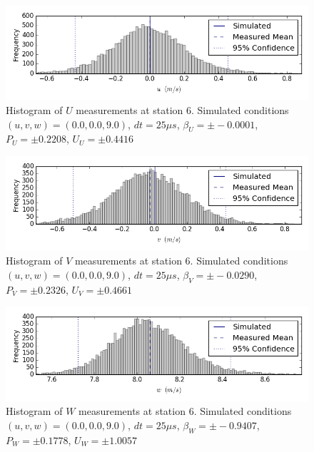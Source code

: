 \begin{figure}[H]
\centering
\includegraphics[width=6in]{figs/Ely_May28th06003/uncertainty_Ely_May28th06003_U}
\caption{Histogram of $U$ measurements at station 6. Simulated conditions $(u,v,w)=(0.0, 0.0, 9.0)$, $dt=25 \mu s$, $\beta_U=\pm -0.0001$, $P_U=\pm 0.2208$, $U_U=\pm 0.4416$}
\label{fig:uncertainty_Ely_May28th06003_U}
\end{figure}


\begin{figure}[H]
\centering
\includegraphics[width=6in]{figs/Ely_May28th06003/uncertainty_Ely_May28th06003_V}
\caption{Histogram of $V$ measurements at station 6. Simulated conditions $(u,v,w)=(0.0, 0.0, 9.0)$, $dt=25 \mu s$, $\beta_V=\pm -0.0290$, $P_V=\pm 0.2326$, $U_V=\pm 0.4661$}
\label{fig:uncertainty_Ely_May28th06003_V}
\end{figure}


\begin{figure}[H]
\centering
\includegraphics[width=6in]{figs/Ely_May28th06003/uncertainty_Ely_May28th06003_W}
\caption{Histogram of $W$ measurements at station 6. Simulated conditions $(u,v,w)=(0.0, 0.0, 9.0)$, $dt=25 \mu s$, $\beta_W=\pm -0.9407$, $P_W=\pm 0.1778$, $U_W=\pm 1.0057$}
\label{fig:uncertainty_Ely_May28th06003_W}
\end{figure}


